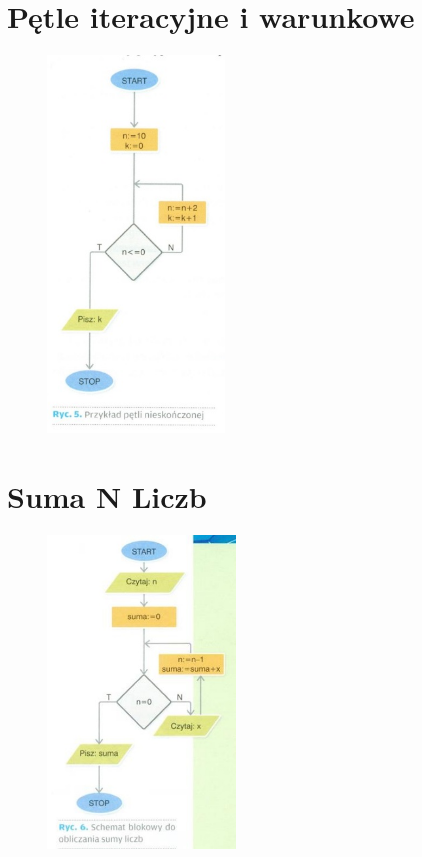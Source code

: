 \documentclass[a4paper,11pt]{article}
\begin{document}
\section{Pętle iteracyjne i warunkowe}
\begin{figure}[ht]
\centering
\includegraphics[height=10cm]{rys4}
\end{figure}
\newpage

\section{Suma N Liczb}
\begin{figure}[ht]
\centering
\includegraphics[width=5cm]{rys5}
\end{figure}
\end{document}
